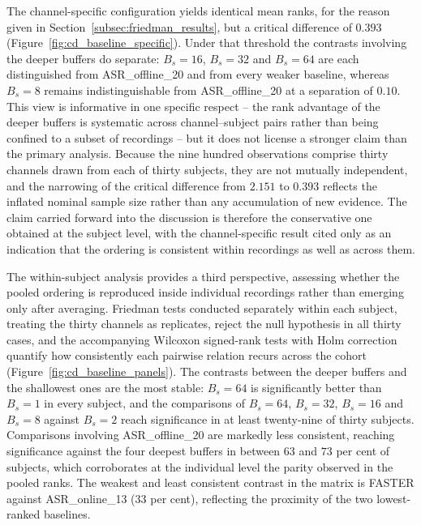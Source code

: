 \documentclass[MScCS,12pt,oneside,final]{uccthesis}
\begin{document}
The channel-specific configuration yields identical mean ranks, for the reason given in Section~\ref{subsec:friedman_results}, but a critical difference of $0.393$ (Figure~\ref{fig:cd_baseline_specific}). Under that threshold the contrasts involving the deeper buffers do separate: $B_s = 16$, $B_s = 32$ and $B_s = 64$ are each distinguished from ASR\_offline\_20 and from every weaker baseline, whereas $B_s = 8$ remains indistinguishable from ASR\_offline\_20 at a separation of $0.10$. This view is informative in one specific respect -- the rank advantage of the deeper buffers is systematic across channel--subject pairs rather than being confined to a subset of recordings -- but it does not license a stronger claim than the primary analysis. Because the nine hundred observations comprise thirty channels drawn from each of thirty subjects, they are not mutually independent, and the narrowing of the critical difference from $2.151$ to $0.393$ reflects the inflated nominal sample size rather than any accumulation of new evidence. The claim carried forward into the discussion is therefore the conservative one obtained at the subject level, with the channel-specific result cited only as an indication that the ordering is consistent within recordings as well as across them.

The within-subject analysis provides a third perspective, assessing whether the pooled ordering is reproduced inside individual recordings rather than emerging only after averaging. Friedman tests conducted separately within each subject, treating the thirty channels as replicates, reject the null hypothesis in all thirty cases, and the accompanying Wilcoxon signed-rank tests with Holm correction quantify how consistently each pairwise relation recurs across the cohort (Figure~\ref{fig:cd_baseline_panels}). The contrasts between the deeper buffers and the shallowest ones are the most stable: $B_s = 64$ is significantly better than $B_s = 1$ in every subject, and the comparisons of $B_s = 64$, $B_s = 32$, $B_s = 16$ and $B_s = 8$ against $B_s = 2$ reach significance in at least twenty-nine of thirty subjects. Comparisons involving ASR\_offline\_20 are markedly less consistent, reaching significance against the four deepest buffers in between $63$ and $73$ per cent of subjects, which corroborates at the individual level the parity observed in the pooled ranks. The weakest and least consistent contrast in the matrix is FASTER against ASR\_online\_13 ($33$ per cent), reflecting the proximity of the two lowest-ranked baselines.
\end{document}
